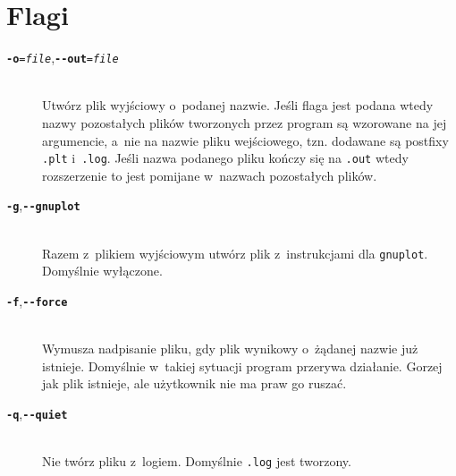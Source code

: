 \documentclass[10pt,a4paper]{article}
\newcommand{\prog}[1]{\texttt{#1}}
\newcommand{\flag}[1]{\textbf{\prog{#1}}}
\begin{document}
\section{Flagi}
\label{sec:flagi}

\begin{description}
  \item[\flag{-o}{\tt\textsl{=file}},\quad\flag{-\--out}{\tt\textsl{=file}}] \hfill \\
    Utwórz plik wyjściowy o~podanej nazwie. Jeśli flaga jest podana wtedy nazwy
    pozostałych plików tworzonych przez program są wzorowane na jej argumencie,
    a~nie na nazwie pliku wejściowego, tzn. dodawane są postfixy \prog{.plt}
    i~\prog{.log}. Jeśli nazwa podanego pliku kończy się na \prog{.out} wtedy
    rozszerzenie to jest pomijane w~nazwach pozostałych plików.
  \item[\flag{-g},\quad\flag{-\--gnuplot}] \hfill \\
    Razem z~plikiem wyjściowym utwórz plik z~instrukcjami dla \prog{gnuplot}.
    Domyślnie wyłączone.
  \item[\flag{-f},\quad\flag{-\--force}] \hfill \\
    Wymusza nadpisanie pliku, gdy plik wynikowy o~żądanej nazwie już istnieje.
    Domyślnie w~takiej sytuacji program przerywa działanie. Gorzej jak plik
    istnieje, ale użytkownik nie ma praw go ruszać.
  \item[\flag{-q},\quad\flag{-\--quiet}] \hfill \\
    Nie twórz pliku z~logiem. Domyślnie \prog{.log} jest tworzony.
\end{description}
\end{document}
